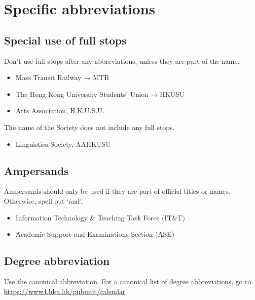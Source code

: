 \documentclass[11pt,a4paper]{book}
\newcommand{\cmark}{{\color{green(html/cssgreen)}\checkmark}}%
\begin{document}
	\section{Specific abbreviations}
		\subsection{Special use of full stops}
		Don't use full stops after any abbreviations, unless they are part of the name.
			{\firasans \begin{mdframed}[backgroundcolor=aliceblue] \begin{itemize}[label=\cmark]
				\item Mass Transit Railway → MTR
				\item The Hong Kong University Students' Union → HKUSU
				\item Arts Association, H.K.U.S.U.
			\end{itemize} \end{mdframed} }
		The name of the Society does not include any full stops.
			{\firasans \begin{mdframed}[backgroundcolor=aliceblue] \begin{itemize}[label=\cmark]
				\item Linguistics Society, AAHKUSU
			\end{itemize} \end{mdframed} }
		\subsection{Ampersands}
		Ampersands should only be used if they are part of official titles or names. Otherwise, spell out `and'.
			{\firasans \begin{mdframed}[backgroundcolor=aliceblue] \begin{itemize}[label=\cmark]
				\item Information Technology \& Teaching Task Force (IT\&T)
				\item Academic Support and Examinations Section (ASE)
			\end{itemize} \end{mdframed} }
		\subsection{Degree abbreviation}
		Use the canonical abbreviation. For a canonical list of degree abbreviations, go to \url{https://www4.hku.hk/pubunit/calendar}
\end{document}
